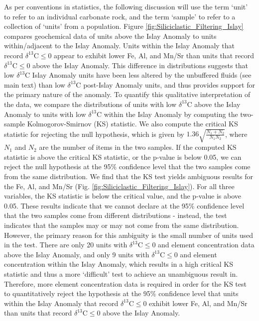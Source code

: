 \documentclass[11pt,letterpaper]{article}
\newcommand{\dC}{$\delta^{13}$C\xspace}
\newcommand{\permil}{\textperthousand\xspace}
\begin{document}
As per conventions in statistics, the following discussion will use the term `unit' to refer to an individual carbonate rock, and the term `sample' to refer to a collection of `units' from a population. Figure \ref{fig:Siliciclastic_Filtering_Islay} compares geochemical data of units above the Islay Anomaly to units within/adjacent to the Islay Anomaly. Units within the Islay Anomaly that record \dC$\leq$0\permil appear to exhibit lower Fe, Al, and Mn/Sr than units that record \dC$\leq$0\permil above the Islay Anomaly. This difference in distributions suggests that low \dC Islay Anomaly units have been less altered by the unbuffered fluids (see main text) than low \dC post-Islay Anomaly units, and thus provides support for the primary nature of the anomaly. To quantify this qualitative interpretation of the data, we compare the distributions of units with low \dC above the Islay Anomaly to units with low \dC within the Islay Anomaly by computing the two-sample Kolmogorov-Smirnov (KS) statistic. We also compute the critical KS statistic for rejecting the null hypothesis, which is given by $1.36\sqrt{\frac{N_{1}+N_{2}}{N_{1}N_{2}}}$, where $N_{1}$ and $N_{2}$ are the number of items in the two samples. If the computed KS statistic is above the critical KS statistic, or the p-value is below 0.05, we can reject the null hypothesis at the 95\% confidence level that the two samples come from the same distribution. We find that the KS test yields ambiguous results for the Fe, Al, and Mn/Sr (Fig. \ref{fig:Siliciclastic_Filtering_Islay}). For all three variables, the KS statistic is below the critical value, and the p-value is above 0.05. These results indicate that we cannot declare at the 95\% confidence level that the two samples come from different distributions - instead, the test indicates that the samples may or may not come from the same distribution. However, the primary reason for this ambiguity is the small number of units used in the test. There are only 20 units with \dC$\leq$0\permil and element concentration data above the Islay Anomaly, and only 9 units with \dC$\leq$0\permil and element concentration within the Islay Anomaly, which results in a high critical KS statistic and thus a more `difficult' test to achieve an unambiguous result in. Therefore, more element concentration data is required in order for the KS test to quantitatively reject the hypothesis at the 95\% confidence level that units within the Islay Anomaly that record \dC$\leq$0\permil exhibit lower Fe, Al, and Mn/Sr than units that record \dC$\leq$0\permil above the Islay Anomaly.
\end{document}
